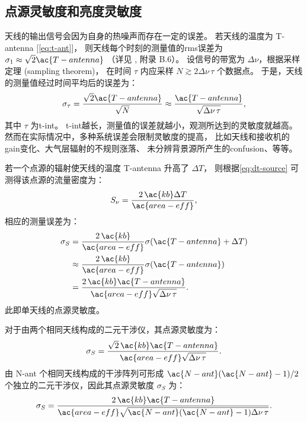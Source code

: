 \subsection{点源灵敏度和亮度灵敏度}

天线的输出信号会因为自身的热噪声而存在一定的误差。
若天线的温度为 \ac{T-antenna} [\autoref{eq:t-ant}]，
则天线每个时刻的测量值的\ac{rms}误差为
$\sigma_1 \approx \sqrt{2} \ac{T-antenna}$
（详见 , 附录 B.6）。
设信号的带宽为 $\Delta\nu$，根据采样定理 (sampling theorem)，
在时间 $\tau$ 内应采样 $N \gtrsim 2 \Delta\nu \,\tau$ 个数据点。
于是，天线的测量值经过时间平均后的误差为：
\begin{equation}
  \label{eq:radiometer}
  \sigma_{\tau}
    = \frac{\sqrt{2} \ac{T-antenna}}{\sqrt{N}}
    \approx \frac{\ac{T-antenna}}{\sqrt{\Delta\nu \,\tau}} ,
\end{equation}
其中 $\tau$ 为\ac{t-int}。
\ac{t-int}越长，测量值的误差就越小，观测所达到的灵敏度就越高。
然而在实际情况中，多种系统误差会限制灵敏度的提高，
比如天线和接收机的\ac{gain}变化、大气层辐射的不规则涨落、
未分辨背景源所产生的\ac{confusion}、等等。

若一个点源的辐射使天线的温度 \ac{T-antenna} 升高了 $\Delta T$，
则根据\autoref{eq:dt-source} 可测得该点源的流量密度为：
\begin{equation}
  S_{\nu} = \frac{2\,\ac{kb} \Delta T}{\ac{area-eff}} ,
\end{equation}
相应的测量误差为：
\begin{align}
  \sigma_S
    & = \frac{2\,\ac{kb}}{\ac{area-eff}} \sigma(\ac{T-antenna} + \Delta T) \\
    & \approx \frac{2\,\ac{kb}}{\ac{area-eff}} \sigma(\ac{T-antenna}) \\
    & = \frac{2\,\ac{kb} \ac{T-antenna}}{
      \ac{area-eff} \sqrt{\Delta\nu \,\tau}} .
\end{align}
此即单天线的点源灵敏度。

对于由两个相同天线构成的二元干涉仪，其点源灵敏度为：
\begin{equation}
  \sigma_S
    = \frac{\sqrt{2}\,\ac{kb} \ac{T-antenna}}{
        \ac{area-eff} \sqrt{\Delta\nu \,\tau}} .
\end{equation}
由 \ac{N-ant} 个相同天线构成的干涉阵列可形成 $\ac{N-ant}(\ac{N-ant}-1)/2$
个独立的二元干涉仪，因此其点源灵敏度 $\sigma_S$ 为：
\begin{equation}
  \label{eq:sigma-ps}
  \sigma_S
    = \frac{2\,\ac{kb} \ac{T-antenna}}{
        \ac{area-eff} \sqrt{\ac{N-ant}(\ac{N-ant}-1) \Delta\nu \,\tau}} .
\end{equation}

